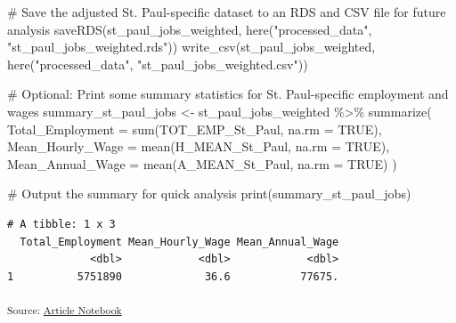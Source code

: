 \documentclass[
  letterpaper,
  DIV=11,
  numbers=noendperiod]{scrartcl}
\newenvironment{Shaded}{\begin{snugshade}}{\end{snugshade}}
\newcommand{\AttributeTok}[1]{\textcolor[rgb]{0.40,0.45,0.13}{#1}}
\newcommand{\CommentTok}[1]{\textcolor[rgb]{0.37,0.37,0.37}{#1}}
\newcommand{\ConstantTok}[1]{\textcolor[rgb]{0.56,0.35,0.01}{#1}}
\newcommand{\FunctionTok}[1]{\textcolor[rgb]{0.28,0.35,0.67}{#1}}
\newcommand{\NormalTok}[1]{\textcolor[rgb]{0.00,0.23,0.31}{#1}}
\newcommand{\OtherTok}[1]{\textcolor[rgb]{0.00,0.23,0.31}{#1}}
\newcommand{\SpecialCharTok}[1]{\textcolor[rgb]{0.37,0.37,0.37}{#1}}
\newcommand{\StringTok}[1]{\textcolor[rgb]{0.13,0.47,0.30}{#1}}
\begin{document}
\begin{Shaded}
\begin{Highlighting}[]
\CommentTok{\# Save the adjusted St. Paul{-}specific dataset to an RDS and CSV file for future analysis}
\FunctionTok{saveRDS}\NormalTok{(st\_paul\_jobs\_weighted, }\FunctionTok{here}\NormalTok{(}\StringTok{"processed\_data"}\NormalTok{, }\StringTok{"st\_paul\_jobs\_weighted.rds"}\NormalTok{))}
\FunctionTok{write\_csv}\NormalTok{(st\_paul\_jobs\_weighted, }\FunctionTok{here}\NormalTok{(}\StringTok{"processed\_data"}\NormalTok{, }\StringTok{"st\_paul\_jobs\_weighted.csv"}\NormalTok{))}

\CommentTok{\# Optional: Print some summary statistics for St. Paul{-}specific employment and wages}
\NormalTok{summary\_st\_paul\_jobs }\OtherTok{\textless{}{-}}\NormalTok{ st\_paul\_jobs\_weighted }\SpecialCharTok{\%\textgreater{}\%}
  \FunctionTok{summarize}\NormalTok{(}
    \AttributeTok{Total\_Employment =} \FunctionTok{sum}\NormalTok{(TOT\_EMP\_St\_Paul, }\AttributeTok{na.rm =} \ConstantTok{TRUE}\NormalTok{),}
    \AttributeTok{Mean\_Hourly\_Wage =} \FunctionTok{mean}\NormalTok{(H\_MEAN\_St\_Paul, }\AttributeTok{na.rm =} \ConstantTok{TRUE}\NormalTok{),}
    \AttributeTok{Mean\_Annual\_Wage =} \FunctionTok{mean}\NormalTok{(A\_MEAN\_St\_Paul, }\AttributeTok{na.rm =} \ConstantTok{TRUE}\NormalTok{)}
\NormalTok{  )}

\CommentTok{\# Output the summary for quick analysis}
\FunctionTok{print}\NormalTok{(summary\_st\_paul\_jobs)}
\end{Highlighting}
\end{Shaded}

\begin{verbatim}
# A tibble: 1 x 3
  Total_Employment Mean_Hourly_Wage Mean_Annual_Wage
             <dbl>            <dbl>            <dbl>
1          5751890             36.6           77675.
\end{verbatim}

\textsubscript{Source:
\href{https://beeckcenter.github.io/climate-equity-workforce/index-preview.html}{Article
Notebook}}
\end{document}
